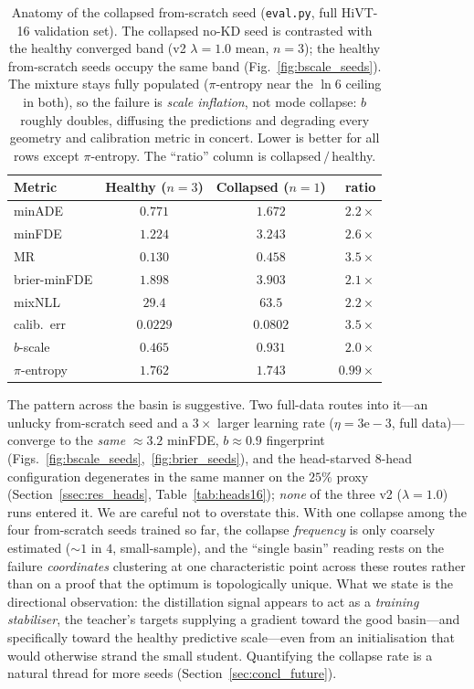 \begin{table}[htbp]
  \centering
  \caption{Anatomy of the collapsed from-scratch seed (\texttt{eval.py}, full
    HiVT-16 validation set). The collapsed no-KD seed is contrasted with the
    healthy converged band (v2 $\lambda{=}1.0$ mean, $n{=}3$); the healthy
    from-scratch seeds occupy the same band (Fig.~\ref{fig:bscale_seeds}). The
    mixture stays fully populated ($\pi$-entropy near the $\ln 6$ ceiling in
    both), so the failure is \emph{scale inflation}, not mode collapse: $b$
    roughly doubles, diffusing the predictions and degrading every geometry and
    calibration metric in concert. Lower is better for all rows except
    $\pi$-entropy. The ``ratio'' column is collapsed\,$/$\,healthy.}
  \label{tab:collapse16}
  \begin{tabular}{lccr}
    \toprule
    Metric & Healthy ($n{=}3$) & Collapsed ($n{=}1$) & ratio \\
    \midrule
    minADE        & $0.771$  & $1.672$  & $2.2\times$ \\
    minFDE        & $1.224$  & $3.243$  & $2.6\times$ \\
    MR            & $0.130$  & $0.458$  & $3.5\times$ \\
    brier-minFDE  & $1.898$  & $3.903$  & $2.1\times$ \\
    mixNLL        & $29.4$   & $63.5$   & $2.2\times$ \\
    calib.\ err   & $0.0229$ & $0.0802$ & $3.5\times$ \\
    $b$-scale     & $0.465$  & $0.931$  & $2.0\times$ \\
    $\pi$-entropy & $1.762$  & $1.743$  & $0.99\times$ \\
    \bottomrule
  \end{tabular}
\end{table}

The pattern across the basin is suggestive. Two full-data routes into it---an
unlucky from-scratch seed and a $3\times$ larger learning rate ($\eta{=}3\mathrm{e}{-}3$,
full data)---converge to the \emph{same} $\approx\!3.2$ minFDE,
$b\!\approx\!0.9$ fingerprint (Figs.~\ref{fig:bscale_seeds},~\ref{fig:brier_seeds}),
and the head-starved $8$-head configuration degenerates in the same manner on the
$25\%$ proxy (Section~\ref{ssec:res_heads}, Table~\ref{tab:heads16}); \emph{none}
of the three v2 ($\lambda{=}1.0$) runs entered it. We are careful not to overstate this.
With one collapse among the four from-scratch seeds trained so far, the collapse
\emph{frequency} is only coarsely estimated ($\sim\!1$ in $4$, small-sample), and the
``single basin'' reading rests on the failure \emph{coordinates} clustering at one
characteristic point across these routes rather than on a proof that the optimum
is topologically unique. What we state is the directional observation: the
distillation signal appears to act as a \emph{training stabiliser}, the teacher's
targets supplying a gradient toward the good basin---and specifically toward the
healthy predictive scale---even from an initialisation that would otherwise strand
the small student. Quantifying the collapse rate is a natural thread for more
seeds (Section~\ref{sec:concl_future}).

